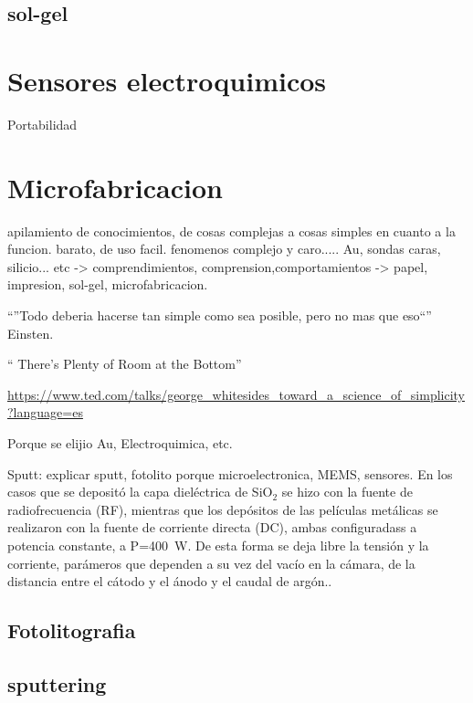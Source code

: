 	\subsection{sol-gel}	

\section{Sensores electroquimicos}

Portabilidad

\section{Microfabricacion}\label{sec:microfabricacion}
apilamiento de conocimientos, de cosas complejas a cosas simples en cuanto a la funcion. barato, de uso facil.
fenomenos complejo y caro..... Au, sondas caras, silicio... etc -> comprendimientos, comprension,comportamientos -> papel, impresion, sol-gel, \cite{Whitesides2015,Burdass2010}microfabricacion.

``''Todo deberia hacerse tan simple como sea posible, pero no mas que eso``'' Einsten.

`` There's Plenty of Room at the Bottom''

\url{https://www.ted.com/talks/george_whitesides_toward_a_science_of_simplicity?language=es}\cite{ted_whitesides2010}

Porque se elijio Au, Electroquimica, etc.

Sputt: explicar sputt, fotolito porque microelectronica, MEMS, sensores.
En los casos que se depositó la capa dieléctrica de SiO$_2$ se hizo con la fuente de radiofrecuencia (RF), mientras que los depósitos de las películas metálicas se realizaron con la fuente de corriente directa (DC), ambas configuradass a potencia constante, a P=\SI{400}{\watt}.  De esta forma se deja libre la tensión y la corriente, parámeros que dependen a su vez del vacío en la cámara, de la distancia entre el cátodo y el ánodo y el caudal de argón.\cite{sigmund1968}. 

\subsection{Fotolitografia}\label{sec:intro_fotolito}

\subsection{sputtering}

